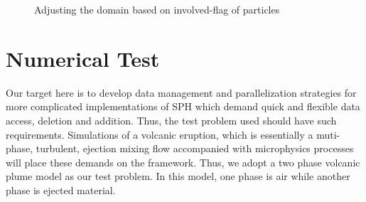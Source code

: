 \documentclass[conference,compsoc]{IEEEtran}
\begin{document}
\begin{figure}[!t]
\centering
{}
\label{fig:Involved_initial}
\hfil
{}
\label{fig:Involved_domain_adjusting}
\caption{ Adjusting the domain based on involved-flag of particles}
\label{fig:Domain_adjusting}
\end{figure}
\section{Numerical Test}
Our target here is to develop data management and parallelization strategies for more complicated implementations of SPH which demand quick and flexible data access, deletion and addition. Thus, the test problem used should have such requirements. Simulations of a volcanic eruption, which is essentially a muti-phase, turbulent, ejection mixing flow accompanied with microphysics processes will place these demands on the framework. Thus, we adopt a two phase volcanic plume model\cite{suzuki2005numerical} as our test problem. In this model, one phase is air while another phase is ejected material.
\end{document}

